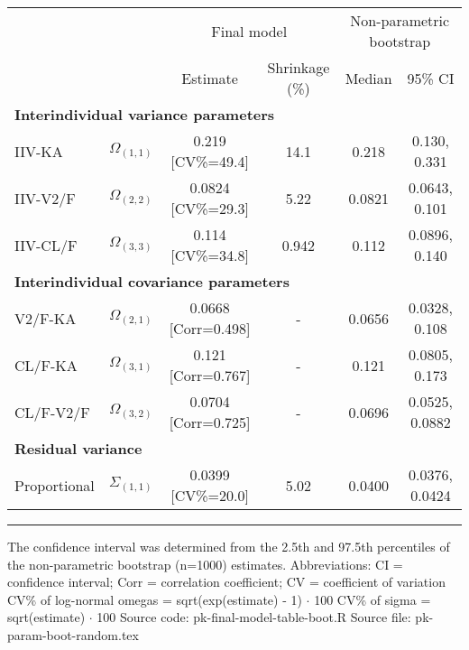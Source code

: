 \setlength{\tabcolsep}{5pt} 
\begin{threeparttable}
\renewcommand{\arraystretch}{1.3}
\begin{tabular}[h]{lccccc}
\hline
\multicolumn{2}{c}{} & \multicolumn{2}{c}{Final model} & \multicolumn{2}{c}{Non-parametric bootstrap} \\
\cmidrule(lr){3-4}
\cmidrule(lr){5-6}
 &  & Estimate & Shrinkage (\%) & Median & 95\% CI \\
\hline
\multicolumn{6}{l}{\textbf{Interindividual variance parameters}}\\%
IIV-KA & $\Omega_{(1,1)}$ & 0.219 [CV\%=49.4] & 14.1 & 0.218 & 0.130, 0.331 \\
IIV-V2/F & $\Omega_{(2,2)}$ & 0.0824 [CV\%=29.3] & 5.22 & 0.0821 & 0.0643, 0.101 \\
IIV-CL/F & $\Omega_{(3,3)}$ & 0.114 [CV\%=34.8] & 0.942 & 0.112 & 0.0896, 0.140 \\
\hline \multicolumn{6}{l}{\textbf{Interindividual covariance parameters}}\\%
V2/F-KA & $\Omega_{(2,1)}$ & 0.0668 [Corr=0.498] & - & 0.0656 & 0.0328, 0.108 \\
CL/F-KA & $\Omega_{(3,1)}$ & 0.121 [Corr=0.767] & - & 0.121 & 0.0805, 0.173 \\
CL/F-V2/F & $\Omega_{(3,2)}$ & 0.0704 [Corr=0.725] & - & 0.0696 & 0.0525, 0.0882 \\
\hline \multicolumn{6}{l}{\textbf{Residual variance}}\\%
Proportional & $\Sigma_{(1,1)}$ & 0.0399 [CV\%=20.0] & 5.02 & 0.0400 & 0.0376, 0.0424 \\
\hline
\end{tabular}
\end{threeparttable}
\vskip 0.67cm
\begin{minipage}{1\linewidth}
\linespread{1.1}\selectfont
\rule{1\linewidth}{0.4pt}
\vskip 0.02cm
The confidence interval was determined from the 
2.5th and 97.5th percentiles of the non-parametric 
bootstrap (n=1000) estimates. \newline
Abbreviations: CI = confidence interval; 
                        Corr = correlation coefficient;
                        CV = coefficient of variation \newline
CV\% of log-normal omegas = sqrt(exp(estimate) - 1) $\cdot$ 100 \newline
CV\% of sigma = sqrt(estimate) $\cdot$ 100 \newline
Source code: pk-final-model-table-boot.R \newline
Source file: pk-param-boot-random.tex \newline
\end{minipage}
